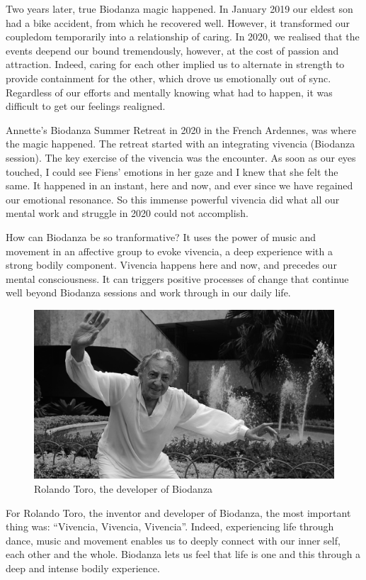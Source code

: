 \documentclass[
  11pt,
]{book}
\begin{document}
Two years later, true Biodanza magic happened.
In January 2019 our eldest son had a bike accident, from which he recovered well.
However, it transformed our coupledom temporarily into a relationship of caring. In 2020, we realised that the events deepend our bound tremendously, however, at the cost of passion and attraction. Indeed, caring for each other implied us to alternate in strength to provide containment for the other, which drove us emotionally out of sync. Regardless of our efforts and mentally knowing what had to happen, it was difficult to get our feelings realigned.

Annette's Biodanza Summer Retreat in 2020 in the French Ardennes, was where the magic happened. The retreat started with an integrating vivencia (Biodanza session). The key exercise of the vivencia was the encounter. As soon as our eyes touched, I could see Fiens' emotions in her gaze and I knew that she felt the same. It happened in an instant, here and now, and ever since we have regained our emotional resonance. So this immense powerful vivencia did what all our mental work and struggle in 2020 could not accomplish.

How can Biodanza be so tranformative?
It uses the power of music and movement in an affective group to evoke vivencia, a deep experience with a strong bodily component. Vivencia happens here and now, and precedes our mental consciousness. It can triggers positive processes of change that continue well beyond Biodanza sessions and work through in our daily life.

\begin{figure}

{\centering \includegraphics[width=0.45\linewidth]{./figs/rolando} 

}

\caption{Rolando Toro, the developer of Biodanza}\label{fig:rolandoToro}
\end{figure}

For Rolando Toro, the inventor and developer of Biodanza, the most important thing was: ``Vivencia, Vivencia, Vivencia''. Indeed, experiencing life through dance, music and movement enables us to deeply connect with our inner self, each other and the whole. Biodanza lets us feel that life is one and this through a deep and intense bodily experience.
\end{document}
